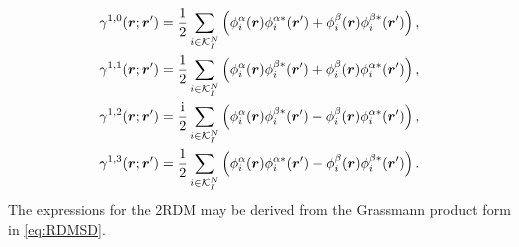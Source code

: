 \begin{subequations}
  \label{eq:SpinorDensity}
\begin{align}
  &\gamma^{1,0}(\boldsymbol{r};\boldsymbol{r}') = \frac{1}{2}   \sum_{i\in\mathcal{K}^N_I}\left(\phi^{\alpha}_i(\boldsymbol{r})\phi^{\alpha*}_i(\boldsymbol{r}') + \phi^{\beta}_i(\boldsymbol{r})\phi^{\beta *}_i(\boldsymbol{r}') \right), \\
  &\gamma^{1,1}(\boldsymbol{r};\boldsymbol{r}') = \frac{1}{2}   \sum_{i\in\mathcal{K}^N_I}\left(\phi^{\alpha}_i(\boldsymbol{r})\phi^{\beta *}_i(\boldsymbol{r}') + \phi^{\beta}_i(\boldsymbol{r})\phi^{\alpha*}_i(\boldsymbol{r}') \right), \\
  &\gamma^{1,2}(\boldsymbol{r};\boldsymbol{r}') = \frac{\mathrm i}{2} \sum_{i\in\mathcal{K}^N_I}\left(\phi^{\alpha}_i(\boldsymbol{r})\phi^{\beta *}_i(\boldsymbol{r}') - \phi^{\beta}_i(\boldsymbol{r})\phi^{\alpha*}_i(\boldsymbol{r}') \right), \\
  &\gamma^{1,3}(\boldsymbol{r};\boldsymbol{r}') = \frac{1}{2}   \sum_{i\in\mathcal{K}^N_I}\left(\phi^{\alpha}_i(\boldsymbol{r})\phi^{\alpha*}_i(\boldsymbol{r}') - \phi^{\beta}_i(\boldsymbol{r})\phi^{\beta *}_i(\boldsymbol{r}') \right). 
\end{align}
\end{subequations}
The expressions for the 2RDM may be derived from the Grassmann product form in \cref{eq:RDMSD}.


